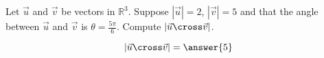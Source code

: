 \documentclass{ximera}
\author{Gregory Hartman \and Matthew Carr}
\begin{document}
\begin{exercise}
Let $\vec{u}$ and $\vec{v}$ be vectors in $\mathbb{R}^3$. Suppose
$|\vec{u}|=2$, $|\vec{v}|=5$ and that the angle between $\vec{u}$ and
$\vec{v}$ is $\theta=\frac{5\pi}{6}$. Compute
$|\vec{u}\cross\vec{v}|$.

\begin{prompt}
\[
|\vec{u}\cross\vec{v}|=\answer{5}
\]
\end{prompt}


\end{exercise}
\end{document}
